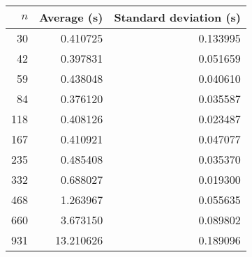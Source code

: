 \begin{tabular}{rrr}
$n$ & Average (s) & Standard deviation (s)\\\hline
30 & 0.410725 & 0.133995\\
42 & 0.397831 & 0.051659\\
59 & 0.438048 & 0.040610\\
84 & 0.376120 & 0.035587\\
118 & 0.408126 & 0.023487\\
167 & 0.410921 & 0.047077\\
235 & 0.485408 & 0.035370\\
332 & 0.688027 & 0.019300\\
468 & 1.263967 & 0.055635\\
660 & 3.673150 & 0.089802\\
931 & 13.210626 & 0.189096\\
\end{tabular}
